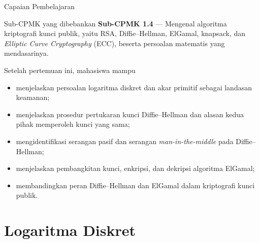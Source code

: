 \documentclass[aspectratio=169,11pt]{beamer}
\begin{document}
\begin{frame}{Capaian Pembelajaran}
    \begin{block}{Sub-CPMK yang dibebankan}
        \textbf{Sub-CPMK 1.4} --- Mengenal algoritma kriptografi kunci publik,
        yaitu RSA, Diffie--Hellman, ElGamal, knapsack, dan \textit{Elliptic
        Curve Cryptography} (ECC), beserta persoalan matematis yang
        mendasarinya.
    \end{block}
    \vspace{0.2cm}
    \begin{exampleblock}{Setelah pertemuan ini, mahasiswa mampu}
        \footnotesize
        \begin{itemize}
            \item menjelaskan persoalan logaritma diskret dan akar primitif
                  sebagai landasan keamanan;
            \item menjelaskan prosedur pertukaran kunci Diffie--Hellman dan
                  alasan kedua pihak memperoleh kunci yang sama;
            \item mengidentifikasi serangan pasif dan serangan
                  \textit{man-in-the-middle} pada Diffie--Hellman;
            \item menjelaskan pembangkitan kunci, enkripsi, dan dekripsi
                  algoritma ElGamal;
            \item membandingkan peran Diffie--Hellman dan ElGamal dalam
                  kriptografi kunci publik.
        \end{itemize}
    \end{exampleblock}
\end{frame}

\section{Logaritma Diskret}
\end{document}
